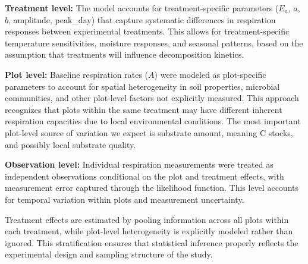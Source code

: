 \documentclass[12pt,a4paper]{article}
\begin{document}
\textbf{Treatment level:} The model accounts for treatment-specific parameters ($E_a$, $a$, $b$, amplitude, peak\_day) that capture systematic differences in respiration responses between experimental treatments. This allows for treatment-specific temperature sensitivities, moisture responses, and seasonal patterns, based on the assumption that treatments will influence decomposition kinetics.

\textbf{Plot level:} Baseline respiration rates ($A$) were modeled as plot-specific parameters to account for spatial heterogeneity in soil properties, microbial communities, and other plot-level factors not explicitly measured. This approach recognizes that plots within the same treatment may have different inherent respiration capacities due to local environmental conditions. The most important plot-level source of variation we expect is substrate amount, meaning C stocks, and possibly local substrate quality.

\textbf{Observation level:} Individual respiration measurements were treated as independent observations conditional on the plot and treatment effects, with measurement error captured through the likelihood function. This level accounts for temporal variation within plots and measurement uncertainty.

Treatment effects are estimated by pooling information across all plots within each treatment, while plot-level heterogeneity is explicitly modeled rather than ignored. This stratification ensures that statistical inference properly reflects the experimental design and sampling structure of the study.
\end{document}
